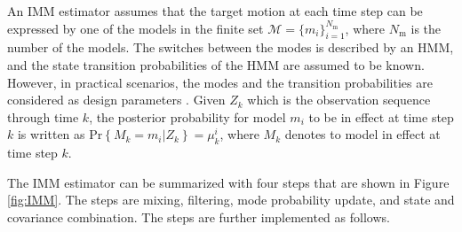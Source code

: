 \documentclass[english, 12pt, a4paper, elec, utf8, a-1b, online]{aaltothesis}
\renewcommand{\Pr}[1]{\text{Pr}\left\{ #1 \right\}}
\newcommand{\modeprob}{\mu_k^i}
\newcommand{\nmodels}{{N_\text{m}}}
\begin{document}
An IMM estimator assumes that the target motion at each time step can be expressed by one of the models in the finite set $\mathcal{M} = \{ m_i \}_{i=1}^\nmodels$, where $\nmodels$ is the number of the models.
The switches between the modes is described by an HMM, and the state transition probabilities of the HMM are assumed to be known.
However, in practical scenarios, the modes and the transition probabilities are considered as design parameters \cite{Simeonova2002}.
Given $Z_k$ which is the observation sequence through time $k$, the posterior probability for model $m_i$ to be in effect at time step $k$ is written as $\Pr{M_k=m_i | Z_k} = \modeprob$, where $M_k$ denotes to model in effect at time step $k$.

The IMM estimator can be summarized with four steps that are shown in Figure \ref{fig:IMM}.
The steps are mixing, filtering, mode probability update, and state and covariance combination. 
The steps are further implemented as follows. 
\end{document}
